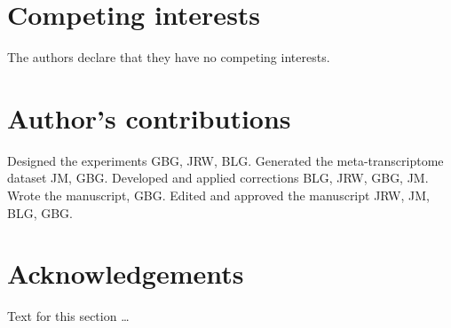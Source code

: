 \documentclass{bmcart}
\begin{document}
\begin{backmatter}

\section*{Competing interests}
  The authors declare that they have no competing interests.

\section*{Author's contributions}
    Designed the experiments GBG, JRW, BLG. Generated the meta-transcriptome dataset JM, GBG. Developed and applied corrections BLG, JRW, GBG, JM. Wrote the manuscript, GBG. Edited and approved the manuscript JRW, JM, BLG, GBG.

\section*{Acknowledgements}
  Text for this section \ldots




\end{backmatter}
\end{document}
